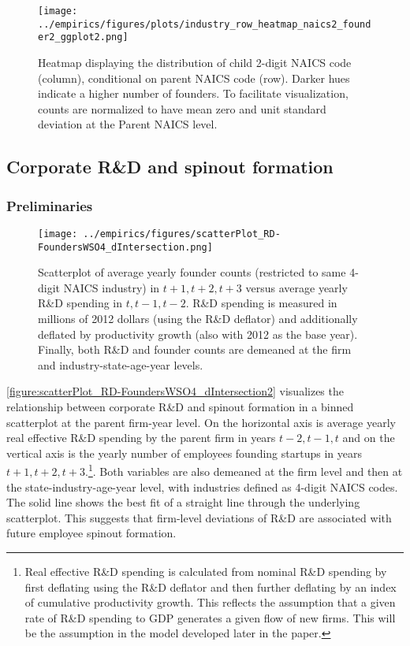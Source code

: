 \documentclass[ecta,nameyear,final]{econsocart}
\theoremstyle{plain}
\theoremstyle{remark}
\begin{document}
\begin{figure}[]
	\centering
	\texttt{[image: ../empirics/figures/plots/industry\_row\_heatmap\_naics2\_founder2\_ggplot2.png]}
	\caption{Heatmap displaying the distribution of child 2-digit NAICS code (column), conditional on parent NAICS code (row). Darker hues indicate a higher number of founders. To facilitate visualization, counts are normalized to have mean zero and unit standard deviation at the Parent NAICS level.}
	\label{figure:industry_row_heatmap_naics2_founder2}
\end{figure}

\subsection{Corporate R\&D and spinout formation}\label{subsec:empirics:corpRDandspinouts}

\subsubsection{Preliminaries}

\begin{figure}[]
	\centering
	\texttt{[image: ../empirics/figures/scatterPlot\_RD-FoundersWSO4\_dIntersection.png]}
	\caption{Scatterplot of average yearly founder counts (restricted to same 4-digit NAICS industry) in $t+1,t+2,t+3$ versus average yearly R\&D spending in $t,t-1,t-2$. R\&D spending is measured in millions of 2012 dollars (using the R\&D deflator) and additionally deflated by productivity growth (also with 2012 as the base year). Finally, both R\&D and founder counts are demeaned at the firm and industry-state-age-year levels.}
	\label{figure:scatterPlot_RD-FoundersWSO4_dIntersection2}
\end{figure}

\autoref{figure:scatterPlot_RD-FoundersWSO4_dIntersection2} visualizes the relationship between corporate R\&D and spinout formation in a binned scatterplot at the parent firm-year level. On the horizontal axis is average yearly real effective R\&D spending by the parent firm in years $t-2,t-1,t$ and on the vertical axis is the yearly number of employees founding startups in years $t+1,t+2,t+3$.\footnote{Real effective R\&D spending is calculated from nominal R\&D spending by first deflating using the R\&D deflator and then further deflating by an index of cumulative productivity growth. This reflects the assumption that a given rate of R\&D spending to GDP generates a given flow of new firms. This will be the assumption in the model developed later in the paper.}. Both variables are also demeaned at the firm level and then at the state-industry-age-year level, with industries defined as 4-digit NAICS codes. The solid line shows the best fit of a straight line through the underlying scatterplot. This suggests that firm-level deviations of R\&D are associated with future employee spinout formation.
\end{document}
